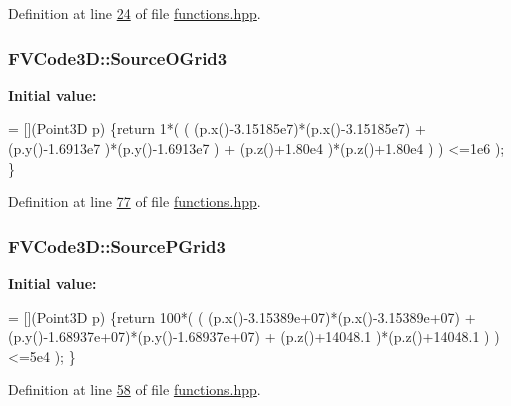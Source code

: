 Definition at line \hyperlink{functions_8hpp_source_l00024}{24} of file \hyperlink{functions_8hpp_source}{functions.\+hpp}.

\subsubsection[{\texorpdfstring{Source\+O\+Grid3}{SourceOGrid3}}]{ F\+V\+Code3\+D\+::\+Source\+O\+Grid3}\hypertarget{namespaceFVCode3D_ac7d83a03f6c58a7410364b917cf7ebc5}{}\label{namespaceFVCode3D_ac7d83a03f6c58a7410364b917cf7ebc5}
{\bfseries Initial value\+:}
\begin{DoxyCode}
= [](Point3D p)
    \{\textcolor{keywordflow}{return} 1*( (
                    (p.x()-3.15185e7)*(p.x()-3.15185e7) +
                    (p.y()-1.6913e7 )*(p.y()-1.6913e7 ) +
                    (p.z()+1.80e4   )*(p.z()+1.80e4   )
                 ) <=1e6
               );
    \}
\end{DoxyCode}


Definition at line \hyperlink{functions_8hpp_source_l00077}{77} of file \hyperlink{functions_8hpp_source}{functions.\+hpp}.

\subsubsection[{\texorpdfstring{Source\+P\+Grid3}{SourcePGrid3}}]{ F\+V\+Code3\+D\+::\+Source\+P\+Grid3}\hypertarget{namespaceFVCode3D_ae622d8dcaded68fd7f8d650f0a8d9f71}{}\label{namespaceFVCode3D_ae622d8dcaded68fd7f8d650f0a8d9f71}
{\bfseries Initial value\+:}
\begin{DoxyCode}
= [](Point3D p)
    \{\textcolor{keywordflow}{return} 100*( (
                    (p.x()-3.15389e+07)*(p.x()-3.15389e+07) +
                    (p.y()-1.68937e+07)*(p.y()-1.68937e+07) +
                    (p.z()+14048.1    )*(p.z()+14048.1    )
                  ) <=5e4
                );
    \}
\end{DoxyCode}


Definition at line \hyperlink{functions_8hpp_source_l00058}{58} of file \hyperlink{functions_8hpp_source}{functions.\+hpp}.

